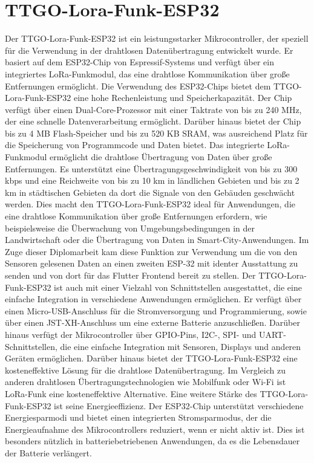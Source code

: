 \section{TTGO-Lora-Funk-ESP32 }
Der TTGO-Lora-Funk-ESP32 ist ein leistungsstarker Mikrocontroller, der speziell für die Verwendung in der drahtlosen Datenübertragung entwickelt wurde. 
Er basiert auf dem ESP32-Chip von Espressif-Systems und verfügt über ein integriertes LoRa-Funkmodul, das eine drahtlose Kommunikation über große Entfernungen ermöglicht.
Die Verwendung des ESP32-Chips bietet dem TTGO-Lora-Funk-ESP32 eine hohe Rechenleistung und Speicherkapazität. 
Der Chip verfügt über einen Dual-Core-Prozessor mit einer Taktrate von bis zu 240 MHz, der eine schnelle Datenverarbeitung ermöglicht. 
Darüber hinaus bietet der Chip bis zu 4 MB Flash-Speicher und bis zu 520 KB SRAM, was ausreichend Platz für die Speicherung von Programmcode und Daten bietet.
Das integrierte LoRa-Funkmodul ermöglicht die drahtlose Übertragung von Daten über große Entfernungen. Es unterstützt eine Übertragungsgeschwindigkeit von bis zu 300 kbps und eine Reichweite von bis zu 10 km in ländlichen Gebieten und bis zu 2 km in städtischen Gebieten da dort die Signale von den Gebäuden geschwächt werden. Dies macht den TTGO-Lora-Funk-ESP32 ideal für Anwendungen, die eine drahtlose Kommunikation über große Entfernungen erfordern, wie beispielsweise die Überwachung von Umgebungsbedingungen in der Landwirtschaft oder die Übertragung von Daten in Smart-City-Anwendungen. Im Zuge dieser Diplomarbeit kam diese Funktion zur Verwendung um die von den Sensoren gelesenen Daten an einen zweiten ESP-32 mit identer Ausstattung zu senden und von dort für das Flutter Frontend bereit zu stellen. 
Der TTGO-Lora-Funk-ESP32 ist auch mit einer Vielzahl von Schnittstellen ausgestattet, die eine einfache Integration in verschiedene Anwendungen ermöglichen. Er verfügt über einen Micro-USB-Anschluss für die Stromversorgung und Programmierung, sowie über einen JST-XH-Anschluss um eine externe Batterie anzuschließen. Darüber hinaus verfügt der Mikrocontroller über GPIO-Pins, I2C-, SPI- und UART-Schnittstellen, die eine einfache Integration mit Sensoren, Displays und anderen Geräten ermöglichen.
Darüber hinaus bietet der TTGO-Lora-Funk-ESP32 eine kosteneffektive Lösung für die drahtlose Datenübertragung. Im Vergleich zu anderen drahtlosen Übertragungstechnologien wie Mobilfunk oder Wi-Fi ist LoRa-Funk eine kosteneffektive Alternative.
Eine weitere Stärke des TTGO-Lora-Funk-ESP32 ist seine Energieeffizienz. Der ESP32-Chip unterstützt verschiedene Energiesparmodi und bietet einen integrierten Stromsparmodus, der die Energieaufnahme des Mikrocontrollers reduziert, wenn er nicht aktiv ist. Dies ist besonders nützlich in batteriebetriebenen Anwendungen, da es die Lebensdauer der Batterie verlängert.

